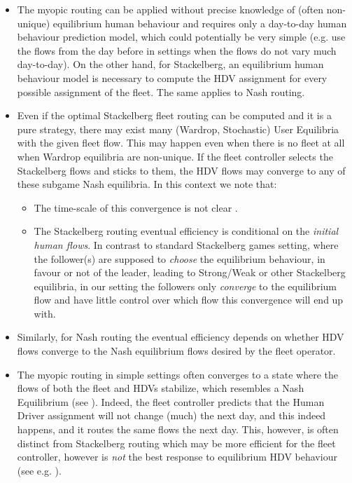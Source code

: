 \documentclass[a4paper,11pt]{article}
\begin{document}
\begin{itemize}
\item The myopic routing can be applied without precise knowledge of (often non-unique) equilibrium human behaviour and requires only a day-to-day human behaviour prediction model, which could potentially be very simple (e.g. use the flows from the day before in settings when the flows do not vary much day-to-day). On the other hand, for Stackelberg, an equilibrium human behaviour model is necessary to compute the HDV assignment for every possible assignment of the fleet. The same applies to Nash routing. 

\item Even if the optimal Stackelberg fleet routing can be computed and it is a pure strategy, there  may exist many (Wardrop, Stochastic) User Equilibria with the given fleet flow. This may happen even when there is no fleet at all when Wardrop equilibria are non-unique. 
If the fleet controller selects the Stackelberg flows and sticks to them, the HDV flows may converge to any of these subgame Nash equilibria. In this context we note that:
\begin{itemize}
\item The time-scale of this convergence is not clear \cite{IWH}.
\item The Stackelberg routing eventual efficiency is conditional on the \emph{initial human flows}. In contrast to standard Stackelberg games setting, where the follower(s) are supposed to \emph{choose} the equilibrium behaviour, in favour or not of the leader, leading to Strong/Weak or other Stackelberg equilibria, in our setting the followers only \emph{converge} to the equilibrium flow and have little control over which flow this convergence will end up with. 
\end{itemize}
\item Similarly, for Nash routing the eventual efficiency depends on whether HDV flows converge to the Nash equilibrium flows desired by the fleet operator. 

\item The myopic routing in simple settings often converges to a state where the flows of both the fleet and HDVs stabilize, which resembles a Nash Equilibrium (see \cite{JamrozSciRep}). Indeed, the fleet controller predicts that the Human Driver assignment will not change (much) the next day, and this indeed happens, and it routes the same flows the next day. This, however, is often distinct from Stackelberg routing which may be more efficient for the fleet controller, however is \emph{not} the best response to equilibrium HDV behaviour (see e.g. \cite{Yin}).


\end{itemize}
\end{document}
